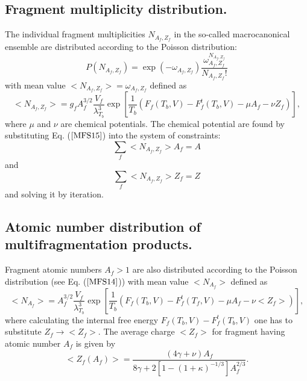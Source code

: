 \subsection{ Fragment multiplicity distribution.}

\hspace{1.0em}The individual fragment multiplicities $N_{A_f,Z_f}$ in
the so-called macrocanonical ensemble \cite{BBIMS95} are distributed
according to the Poisson distribution:
\begin{equation}
\label{MFS14} P(N_{A_f,Z_f}) = \exp{(-\omega_{A_f,Z_f})}
\frac{\omega_{A_f,Z_f}^{N_{A_f,Z_f}}}{N_{A_f,Z_f}!}
\end{equation}
with mean value $<N_{A_f,Z_f}>=\omega_{A_f,Z_f}$ defined as
\begin{equation}
\label{MFS15} <N_{A_f,Z_f}> =g_fA_f^{3/2}\frac{V_f}{\lambda^3_{T_b}}
\exp{[\frac{1}{T_b}(F_f(T_b,V)-F^{t}_f(T_b,V) - \mu A_f - \nu Z_f)]}, 
\end{equation}
where $\mu$ and $\nu$ are chemical potentials. The chemical potential
are found by substituting Eq. ($\ref{MFS15}$) into the system of
constraints:
\begin{equation}
\label{MFS16}\sum_{f}<N_{A_f,Z_f}>A_f = A 
\end{equation}
and
\begin{equation}
\label{MFS17}\sum_{f}<N_{A_f,Z_f}>Z_f = Z
\end{equation}
and solving it by iteration. 
 
 
\subsection{ Atomic number distribution of multifragmentation products.}

\hspace{1.0em}Fragment atomic numbers $A_f > 1$ are also distributed
according to the Poisson distribution \cite{BBIMS95} (see
Eq. ($\ref{MFS14}$)) with mean value $<N_{A_f}>$ defined as
\begin{equation}
\label{MFS18} <N_{A_f}> = A_f^{3/2}\frac{V_f}{\lambda^3_{T_b}}
\exp{[\frac{1}{T_b}(F_f(T_b,V)-F^{t}_f(T_f,V) - \mu A_f - \nu <Z_f>)]}, 
\end{equation}
where calculating  the  internal free energy  
$F_f(T_b,V)-F^{t}_f(T_b,V)$  one has to substitute $Z_f
\rightarrow <Z_f>$. The average  charge $<Z_f>$ for fragment having atomic 
number $A_f$ is given by
\begin{equation}
\label{MFS19}<Z_f(A_f)> = \frac{(4\gamma + \nu)A_f}{8\gamma + 2[1 - (1 +
\kappa)^{-1/3}]A_f^{2/3}}.
\end{equation}

